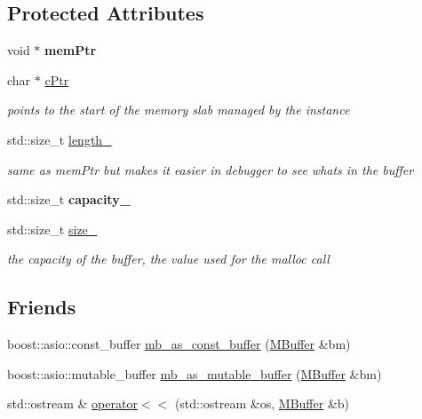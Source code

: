 \subsection*{Protected Attributes}
\begin{DoxyCompactItemize}
\item 
\mbox{\label{struct_m_buffer_ae9f75c8701f5cae42b8384ae4edb1ad1}} 
void $\ast$ {\bfseries mem\+Ptr}
\item 
\mbox{\label{struct_m_buffer_a508d55df27bae34cd8ed486c0b226ab1}} 
char $\ast$ \hyperlink{struct_m_buffer_a508d55df27bae34cd8ed486c0b226ab1}{c\+Ptr}
\begin{DoxyCompactList}\small\item\em points to the start of the memory slab managed by the instance \end{DoxyCompactList}\item 
\mbox{\label{struct_m_buffer_a98d22bf882aa625b6cf24cfc2f34be5e}} 
std\+::size\+\_\+t \hyperlink{struct_m_buffer_a98d22bf882aa625b6cf24cfc2f34be5e}{length\+\_\+}
\begin{DoxyCompactList}\small\item\em same as mem\+Ptr but makes it easier in debugger to see whats in the buffer \end{DoxyCompactList}\item 
\mbox{\label{struct_m_buffer_a69e539d29403f2c50eec2cf75819549e}} 
std\+::size\+\_\+t {\bfseries capacity\+\_\+}
\item 
\mbox{\label{struct_m_buffer_a6e6bea091fb15983fd4f36a51150cabf}} 
std\+::size\+\_\+t \hyperlink{struct_m_buffer_a6e6bea091fb15983fd4f36a51150cabf}{size\+\_\+}
\begin{DoxyCompactList}\small\item\em the capacity of the buffer, the value used for the malloc call \end{DoxyCompactList}\end{DoxyCompactItemize}
\subsection*{Friends}
\begin{DoxyCompactItemize}
\item 
boost\+::asio\+::const\+\_\+buffer \hyperlink{struct_m_buffer_a7c4fdebaff03d8d95c7915a9da1f8490}{mb\+\_\+as\+\_\+const\+\_\+buffer} (\hyperlink{struct_m_buffer}{M\+Buffer} \&bm)
\item 
boost\+::asio\+::mutable\+\_\+buffer \hyperlink{struct_m_buffer_a13c4f6e4208776d422e20509d873404d}{mb\+\_\+as\+\_\+mutable\+\_\+buffer} (\hyperlink{struct_m_buffer}{M\+Buffer} \&bm)
\item 
std\+::ostream \& \hyperlink{struct_m_buffer_abdaf184bb8d819d10f4676a9782e7bec}{operator$<$$<$} (std\+::ostream \&os, \hyperlink{struct_m_buffer}{M\+Buffer} \&b)
\end{DoxyCompactItemize}



